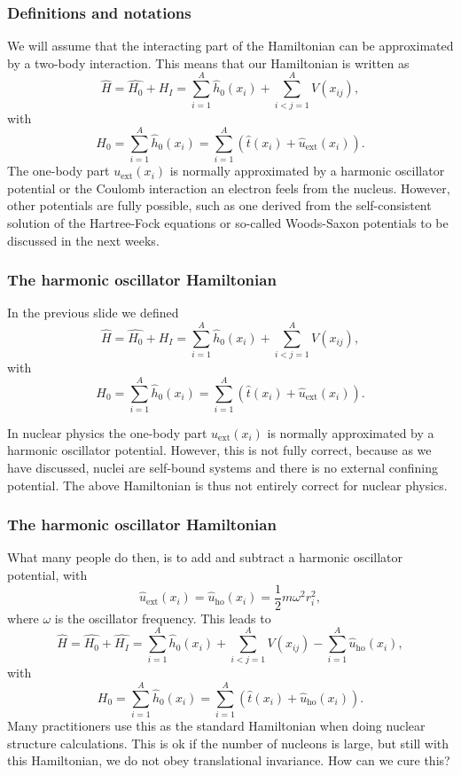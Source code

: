 \documentclass[compress]{beamer}
\begin{document}
\frame
{
  \frametitle{Definitions and notations}
\begin{small}
{\scriptsize
We will assume that the interacting part of the Hamiltonian
can be approximated by a two-body interaction.
This means that our Hamiltonian is written as 
\begin{equation}
    \hat{H} = \hat{H_0} + \hat{H_I} 
    = \sum_{i=1}^A \hat{h}_0(x_i) + \sum_{i<j=1}^A V(x_{ij}),
\label{Hnuclei}
\end{equation}
with 
\begin{equation}
  H_0=\sum_{i=1}^A \hat{h}_0(x_i) =  \sum_{i=1}^A\left(\hat{t}(x_i) + \hat{u}_{\mathrm{ext}}(x_i)\right).
\label{hinuclei}
\end{equation}
The one-body part $u_{\mathrm{ext}}(x_i)$ is normally approximated by a harmonic oscillator potential or the Coulomb interaction an electron feels from the nucleus. However, other potentials are fully possible, such as 
one derived from the self-consistent solution of the Hartree-Fock equations or so-called Woods-Saxon potentials to be discussed in the next weeks.
}
\end{small}
}


\frame
{
  \frametitle{The harmonic oscillator Hamiltonian}
\begin{small}
{\scriptsize
In the previous slide we defined
\[
    \hat{H} = \hat{H_0} + \hat{H_I} 
    = \sum_{i=1}^A \hat{h}_0(x_i) + \sum_{i<j=1}^A V(x_{ij}),
\]
with 
\[
  H_0=\sum_{i=1}^A \hat{h}_0(x_i) =  \sum_{i=1}^A\left(\hat{t}(x_i) + \hat{u}_{\mathrm{ext}}(x_i)\right).
\]

In nuclear physics the one-body part $u_{\mathrm{ext}}(x_i)$ is normally approximated by a harmonic oscillator potential. However, this is not fully correct, because as we have discussed, nuclei are self-bound systems and there is no external confining potential. The above Hamiltonian is thus not entirely correct for nuclear physics.
}
\end{small}
}


\frame
{
  \frametitle{The harmonic oscillator Hamiltonian}
\begin{small}
{\scriptsize
What many people do then, is to add and subtract a harmonic oscillator potential,
with 
\[
\hat{u}_{\mathrm{ext}}(x_i)=\hat{u}_{\mathrm{ho}}(x_i)= \frac{1}{2}m\omega^2 r_i^2,
\]
where $\omega$ is the oscillator frequency. This leads to 
\[
    \hat{H} = \hat{H_0} + \hat{H_I} 
    = \sum_{i=1}^A \hat{h}_0(x_i) + \sum_{i<j=1}^A V(x_{ij})-\sum_{i=1}^A\hat{u}_{\mathrm{ho}}(x_i),
\]
with 
\[
  H_0=\sum_{i=1}^A \hat{h}_0(x_i) =  \sum_{i=1}^A\left(\hat{t}(x_i) + \hat{u}_{\mathrm{ho}}(x_i)\right).
\]
Many practitioners use this as the standard Hamiltonian when doing nuclear structure calculations. 
This is ok if the number of nucleons is large, but still with this Hamiltonian, we do not obey translational invariance.  How can we cure this?
}
\end{small}
}
\end{document}
